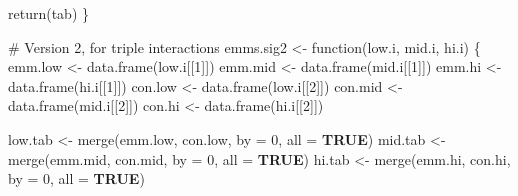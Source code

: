 \documentclass[
  bookmarksnumbered]{article}
\newenvironment{Shaded}{\begin{snugshade}}{\end{snugshade}}
\newcommand{\AttributeTok}[1]{\textcolor[rgb]{0.80,0.80,0.80}{#1}}
\newcommand{\CommentTok}[1]{\textcolor[rgb]{0.50,0.62,0.50}{#1}}
\newcommand{\ConstantTok}[1]{\textcolor[rgb]{0.86,0.64,0.64}{\textbf{#1}}}
\newcommand{\ControlFlowTok}[1]{\textcolor[rgb]{0.94,0.87,0.69}{#1}}
\newcommand{\DecValTok}[1]{\textcolor[rgb]{0.86,0.86,0.80}{#1}}
\newcommand{\FunctionTok}[1]{\textcolor[rgb]{0.94,0.94,0.56}{#1}}
\newcommand{\NormalTok}[1]{\textcolor[rgb]{0.80,0.80,0.80}{#1}}
\newcommand{\OtherTok}[1]{\textcolor[rgb]{0.94,0.94,0.56}{#1}}
\begin{document}
\begin{Shaded}
\begin{Highlighting}[]
  \FunctionTok{return}\NormalTok{(tab)}
\NormalTok{\}}

\CommentTok{\# Version 2, for triple interactions}
\NormalTok{emms.sig2 }\OtherTok{\textless{}{-}} \ControlFlowTok{function}\NormalTok{(low.i, mid.i, hi.i) \{}
\NormalTok{  emm.low }\OtherTok{\textless{}{-}} \FunctionTok{data.frame}\NormalTok{(low.i[[}\DecValTok{1}\NormalTok{]])}
\NormalTok{  emm.mid }\OtherTok{\textless{}{-}} \FunctionTok{data.frame}\NormalTok{(mid.i[[}\DecValTok{1}\NormalTok{]])}
\NormalTok{  emm.hi }\OtherTok{\textless{}{-}} \FunctionTok{data.frame}\NormalTok{(hi.i[[}\DecValTok{1}\NormalTok{]])}
\NormalTok{  con.low }\OtherTok{\textless{}{-}} \FunctionTok{data.frame}\NormalTok{(low.i[[}\DecValTok{2}\NormalTok{]])}
\NormalTok{  con.mid }\OtherTok{\textless{}{-}} \FunctionTok{data.frame}\NormalTok{(mid.i[[}\DecValTok{2}\NormalTok{]])}
\NormalTok{  con.hi }\OtherTok{\textless{}{-}} \FunctionTok{data.frame}\NormalTok{(hi.i[[}\DecValTok{2}\NormalTok{]])}

\NormalTok{  low.tab }\OtherTok{\textless{}{-}} \FunctionTok{merge}\NormalTok{(emm.low, con.low, }\AttributeTok{by =} \DecValTok{0}\NormalTok{, }\AttributeTok{all =} \ConstantTok{TRUE}\NormalTok{)}
\NormalTok{  mid.tab }\OtherTok{\textless{}{-}} \FunctionTok{merge}\NormalTok{(emm.mid, con.mid, }\AttributeTok{by =} \DecValTok{0}\NormalTok{, }\AttributeTok{all =} \ConstantTok{TRUE}\NormalTok{)}
\NormalTok{  hi.tab }\OtherTok{\textless{}{-}} \FunctionTok{merge}\NormalTok{(emm.hi, con.hi, }\AttributeTok{by =} \DecValTok{0}\NormalTok{, }\AttributeTok{all =} \ConstantTok{TRUE}\NormalTok{)}


\end{Highlighting}
\end{Shaded}
\end{document}
